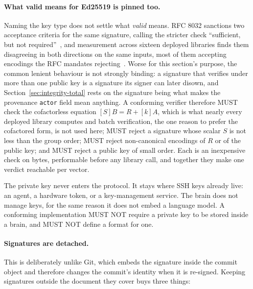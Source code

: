 \documentclass[11pt,a4paper]{article}
\begin{document}
\paragraph{What valid means for Ed25519 is pinned too.}
Naming the key type does not settle what \emph{valid} means. RFC 8032
sanctions two acceptance criteria for the same signature, calling the
stricter check ``sufficient, but not required''~\cite{rfc8032}, and
measurement across sixteen deployed libraries finds them disagreeing in both
directions on the same inputs, most of them accepting encodings the RFC
mandates rejecting~\cite{chalkias2020eddsa, zip215}. Worse for this section's
purpose, the common lenient behaviour is not strongly binding: a signature
that verifies under more than one public key is a signature its signer can
later disown, and Section~\ref{sec:integrity-total} rests on the signature being
what makes the provenance \texttt{actor} field mean anything. A conforming
verifier therefore MUST check the cofactorless equation $[S]B = R + [k]A$,
which is what nearly every deployed library computes and batch verification,
the one reason to prefer the cofactored form, is not used here; MUST reject a
signature whose scalar $S$ is not less than the group order; MUST reject
non-canonical encodings of $R$ or of the public key; and MUST reject a public
key of small order. Each is an inexpensive check on bytes, performable before
any library call, and together they make one verdict reachable per vector.

\begin{callout}[title={Non-goal: key management}]
The private key never enters the protocol. It stays where SSH keys already live:
an agent, a hardware token, or a key-management service. The brain does not
manage keys, for the same reason it does not embed a language model. A
conforming implementation MUST NOT require a private key to be stored inside a
brain, and MUST NOT define a format for one.
\end{callout}

\paragraph{Signatures are detached.}
This is deliberately unlike Git, which embeds the signature inside the commit
object and therefore changes the commit's identity when it is re-signed. Keeping signatures outside the document they cover buys three things:
\end{document}
